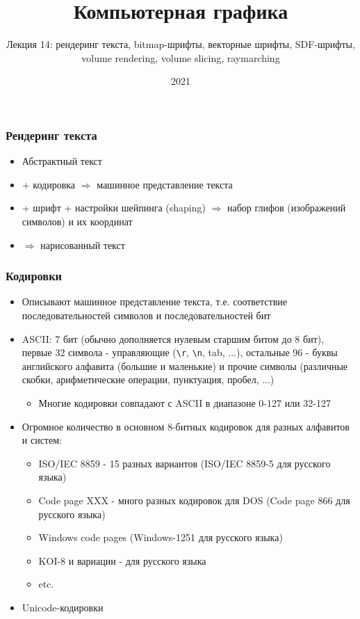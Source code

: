 \documentclass{beamer}
\title{Компьютерная графика}
\subtitle{Лекция 14: рендеринг текста, bitmap-шрифты, векторные шрифты, SDF-шрифты, volume rendering, volume slicing, raymarching}
\date{2021}
\begin{document}
\frame{\titlepage}

\begin{frame}[fragile]
\frametitle{Рендеринг текста}
\begin{itemize}
\item Абстрактный текст
\pause
\item + кодировка \begin{math}\Rightarrow\end{math} машинное представление текста
\pause
\item + шрифт + настройки шейпинга (shaping) \begin{math}\Rightarrow\end{math} набор глифов (изображений символов) и их координат
\pause
\item \begin{math}\Rightarrow\end{math} нарисованный текст
\end{itemize}
\end{frame}

\begin{frame}[fragile]
\frametitle{Кодировки}
\fontsize{10pt}{10pt}
\begin{itemize}
\item Описывают машинное представление текста, т.е. соответствие последовательностей символов и последовательностей бит
\pause
\item ASCII: 7 бит (обычно дополняется нулевым старшим битом до 8 бит), первые 32 символа - управляющие (\verb|\r|, \verb|\n|, tab, ...), остальные 96 - буквы английского алфавита (большие и маленькие) и прочие символы (различные скобки, арифметические операции, пунктуация, пробел, ...)
\pause
\begin{itemize}
\item Многие кодировки совпадают с ASCII в диапазоне 0-127 или 32-127
\end{itemize}
\pause
\item Огромное количество в основном 8-битных кодировок для разных алфавитов и систем:
\begin{itemize}
\item ISO/IEC 8859 - 15 разных вариантов (ISO/IEC 8859-5 для русского языка)
\item Code page XXX - много разных кодировок для DOS (Code page 866 для русского языка)
\item Windows code pages (Windows-1251 для русского языка)
\item KOI-8 и вариации - для русского языка
\item etc.
\end{itemize}
\pause
\item Unicode-кодировки
\end{itemize}
\end{frame}
\end{document}
